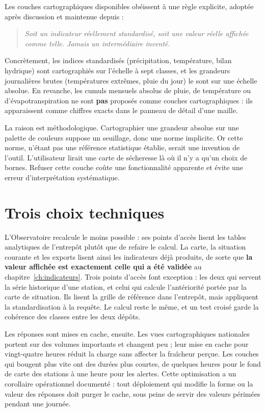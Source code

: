 Les couches cartographiques disponibles obéissent à une règle explicite, adoptée après
discussion et maintenue depuis :

\begin{quote}
\emph{Soit un indicateur réellement standardisé, soit une valeur réelle affichée comme telle.
Jamais un intermédiaire inventé.}
\end{quote}

Concrètement, les indices standardisés (précipitation, température, bilan hydrique) sont
cartographiés sur l'échelle à sept classes, et les grandeurs journalières brutes (températures
extrêmes, pluie du jour) le sont sur une échelle absolue. En revanche, les cumuls mensuels
absolus de pluie, de température ou d'évapotranspiration ne sont \textbf{pas} proposés comme
couches cartographiques : ils apparaissent comme chiffres exacts dans le panneau de détail d'une
maille.

La raison est méthodologique. Cartographier une grandeur absolue sur une palette de couleurs
suppose un seuillage, donc une norme implicite. Or cette norme, n'étant pas une référence
statistique établie, serait une invention de l'outil. L'utilisateur lirait une carte de
sécheresse là où il n'y a qu'un choix de bornes. Refuser cette couche coûte une fonctionnalité
apparente et évite une erreur d'interprétation systématique.

\section{Trois choix techniques}

L'Observatoire recalcule le moins possible : ses points d'accès lisent les tables analytiques de l'entrepôt plutôt que de refaire le calcul. La carte, la
situation courante et les exports lisent ainsi les indicateurs déjà produits, de sorte que
\textbf{la valeur affichée est exactement celle qui a été validée} au
chapitre~\ref{ch:indicateurs}. Trois points d'accès font exception : les deux qui servent la
série historique d'une station, et celui qui calcule l'antériorité portée par la carte de
situation. Ils lisent la grille de référence dans l'entrepôt, mais appliquent la standardisation
à la requête. Le calcul reste le même, et un test croisé garde la cohérence des classes entre
les deux dépôts.

Les réponses sont mises en cache, ensuite. Les vues cartographiques nationales portent sur des
volumes importants et changent peu ; leur mise en cache pour vingt-quatre heures réduit la
charge sans affecter la fraîcheur perçue. Les couches qui bougent plus vite ont des durées plus
courtes, de quelques heures pour le fond de carte des stations à une heure pour les alertes. Cette optimisation a un corollaire opérationnel
documenté : tout déploiement qui modifie la forme ou la valeur des réponses doit purger le
cache, sous peine de servir des valeurs périmées pendant une journée.

